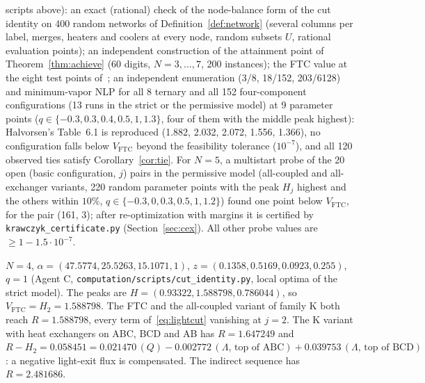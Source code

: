 \documentclass[11pt,a4paper]{report}
\newcommand{\Lam}{\Lambda}
\newcommand{\VFTC}{V_{\mathrm{FTC}}}
\begin{document}
\begin{itemize}
scripts above): an exact (rational) check of the node-balance form of the cut identity on 400 random networks of
Definition~\ref{def:network} (several columns per label, merges, heaters and coolers at every node, random subsets
$U$, rational evaluation points); an independent construction of the attainment point of Theorem~\ref{thm:achieve}
(60 digits, $N=3,\dots,7$, 200 instances); the FTC value at the eight test points of~\autocite{TGAT}; an independent
enumeration (3/8, 18/152, 203/6128) and minimum-vapor NLP for all 8 ternary and all 152 four-component
configurations (13 runs in the strict or the permissive model) at 9 parameter points ($q\in\{-0.3,0.3,0.4,0.5,1,1.3\}$, four of them with
the middle peak highest): Halvorsen's Table~6.1 is reproduced (1.882, 2.032, 2.072, 1.556, 1.366), no configuration
falls below $\VFTC$ beyond the feasibility tolerance ($10^{-7}$), and all 120 observed ties satisfy
Corollary~\ref{cor:tie}. For $N=5$, a multistart probe of the 20 open (basic configuration, $j$) pairs in the
permissive model (all-coupled and all-exchanger variants, 220 random parameter points with the peak $H_j$ highest and
the others within $10\%$, $q\in\{-0.3,0,0.3,0.5,1,1.2\}$) found one point below $\VFTC$, for the pair (161, 3); after
re-optimization with margins it is certified by \texttt{krawczyk\_certificate.py} (Section~\ref{sec:cex}). All
other probe values are $\ge1-1.5\cdot10^{-7}$.
\end{itemize}

\begin{example}
$N=4$, $\alpha=(47.5774,25.5263,15.1071,1)$, $z=(0.1358,0.5169,0.0923,0.255)$, $q=1$ (Agent C,
\texttt{computation/scripts/cut\_identity.py}, local optima of the strict model). The peaks are
$H=(0.93322,1.588798,0.786044)$, so $\VFTC=H_2=1.588798$. The FTC and the all-coupled variant of family K both reach
$R=1.588798$, every term of~\eqref{eq:lightcut} vanishing at $j=2$. The K variant with heat exchangers on ABC, BCD
and AB has $R=1.647249$ and $R-H_2=0.058451=0.021470\,(Q)-0.002772\,(\Lam\text{, top of ABC})+0.039753\,(\Lam\text{, top
of BCD})$: a negative light-exit flux is compensated. The indirect sequence has $R=2.481686$.
\end{example}
\end{document}
